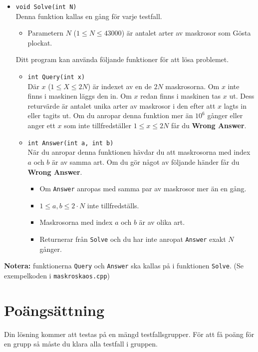 \begin{itemize}
  \item \texttt{void Solve(int N)}\\
  Denna funktion kallas en gång för varje testfall.
  \begin{itemize}
    \item Parametern $N$ ($1 \leq N \leq 43000$) är antalet arter av maskrosor som Gösta plockat.
  \end{itemize}
  Ditt program kan använda följande funktioner för att lösa problemet.
  \begin{itemize}
    \item \texttt{int Query(int x)}\\
    Där $x$ ($1 \leq X \leq 2N$) är indexet av en de $2N$ maskrosorna. Om $x$ inte finns i maskinen läggs den in. Om $x$ redan finns
    i maskinen tas $x$ ut. Dess returvärde är antalet unika arter av maskrosor i den efter att $x$ lagts in eller tagits ut.
    Om du anropar denna funktion mer än $10^6$ gånger eller anger ett $x$ som inte tillfredställer $1 \leq x \leq 2N$
    får du \textbf{Wrong Answer}.
    \item \texttt{int Answer(int a, int b)}\\
    När du anropar denna funktionen hävdar du att maskrosorna med index $a$ och $b$ är av samma art. Om du gör något av följande händer
    får du \textbf{Wrong Answer}.
    \begin{itemize}
      \item Om \texttt{Answer} anropas med samma par av maskrosor mer än en gång.
      \item $1 \leq a,b \leq 2 \cdot N$ inte tillfredställs.
      \item Maskrosorna med index $a$ och $b$ är av olika art.
      \item Returnerar från \texttt{Solve} och du har inte anropat \texttt{Answer} exakt $N$ gånger. 
    \end{itemize}
  \end{itemize}
\end{itemize}

\textbf{Notera:} funktionerna \texttt{Query} och \texttt{Answer} ska kallas på i funktionen \texttt{Solve}. (Se exempelkoden i \texttt{maskroskaos.cpp})

\section*{Poängsättning}
Din lösning kommer att testas på en mängd testfallsgrupper.
För att få poäng för en grupp så måste du klara alla testfall i gruppen.

